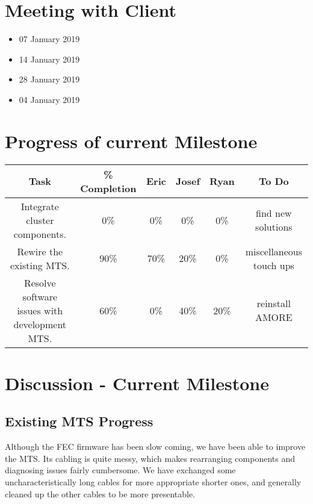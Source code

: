 \documentclass[12pt]{article}
\newcommand\tab[1][1cm]{\hspace*{#1}}
\begin{document}
\section{Meeting with Client}

\begin{itemize}
\item 07 January 2019
\item 14 January 2019
\item 28 January 2019
\item 04 January 2019
\end{itemize}

\section{Progress of current Milestone}

\begin{adjustwidth}{-3.5cm}{}
  \begin{center}
    \begin{tabular}{|c|c|c|c|c|c|}
      \hline
      Task & \% Completion & Eric & Josef & Ryan & To Do \\
      \hline
      Integrate cluster components. & 0\% & 0\% & 0\% & 0\% & find new solutions \\
      Rewire the existing MTS. & 90\% & 70\% & 20\% & 0\% & miscellaneous touch ups \\
      Resolve software issues with development MTS. & 60\% & 0\% & 40\% & 20\% &
                                                                                 reinstall
                                                                                 AMORE
      \\
      \hline   
    \end{tabular}
  \end{center}
\end{adjustwidth}

\section{Discussion - Current Milestone}

\subsection{Existing MTS Progress}

\tab Although the FEC firmware has been slow coming, we have been able to improve the
MTS. Its cabling is quite messy, which makes rearranging components and
diagnosing issues fairly cumbersome. We have exchanged some uncharacteristically
long cables for more appropriate shorter ones, and generally cleaned up the
other cables to be more presentable.
\end{document}
